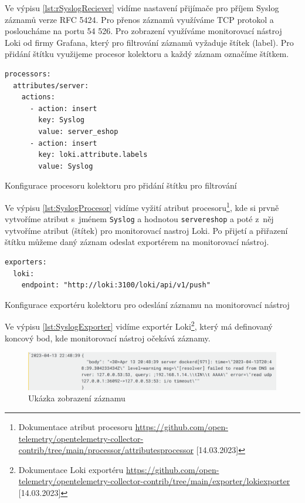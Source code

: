 Ve výpisu \ref{lst:rSyslogReciever} vidíme nastavení přijímače pro příjem Syslog záznamů verze RFC 5424. Pro přenos záznamů využíváme TCP protokol a posloucháme na portu 54 526. Pro zobrazení využíváme monitorovací nástroj Loki od firmy Grafana, který pro filtrování záznamů vyžaduje štítek (label). Pro přidání štítku využijeme procesor kolektoru a každý záznam označíme štítkem.

\begin{listing}[H]
    \begin{verbatim}
processors:
  attributes/server:
    actions:
      - action: insert
        key: Syslog
        value: server_eshop
      - action: insert
        key: loki.attribute.labels
        value: Syslog
\end{verbatim}
    \caption{Konfigurace procesoru kolektoru pro přidání štítku pro filtrování}
    \label{lst:SyslogProcesor}
\end{listing}

Ve výpisu \ref{lst:SyslogProcesor} vidíme vyžití atribut procesoru\footnote{Dokumentace atribut procesoru \url{https://github.com/open-telemetry/opentelemetry-collector-contrib/tree/main/processor/attributesprocessor} [14.03.2023]}, kde si prvně vytvoříme atribut s~jménem \texttt{Syslog} a hodnotou \texttt{server\textunderscore eshop} a poté z~něj vytvoříme atribut (štítek) pro monitorovací nastroj Loki. Po přijetí a přiřazení štítku můžeme daný záznam odeslat exportérem na monitorovací nástroj.

\begin{listing}[H]
    \begin{verbatim}
exporters:
  loki:
    endpoint: "http://loki:3100/loki/api/v1/push"
\end{verbatim}
    \caption{Konfigurace exportéru kolektoru pro odeslání záznamu na monitorovací nástroj}
    \label{lst:SyslogExporter}
\end{listing}

Ve výpisu \ref{lst:SyslogExporter} vidíme exportér Loki\footnote{Dokumentace Loki exportéru \url{https://github.com/open-telemetry/opentelemetry-collector-contrib/tree/main/exporter/lokiexporter} [14.03.2023]}, který má definovaný koncový bod, kde monitorovací nástroj očekává záznamy.

\begin{figure}[H]
  \centering
  \includegraphics[width=15cm]{obrazky-figures/SyslogZaznam.png}
  \caption{Ukázka zobrazení záznamu}
  \label{fig:SyslogZaznam}
\end{figure}


